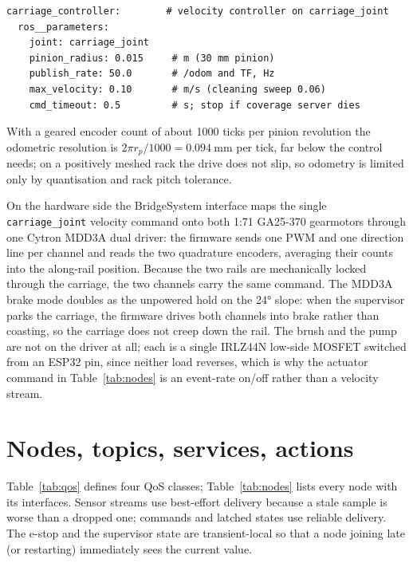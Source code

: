 \documentclass[11pt,a4paper]{article}
\newcommand{\pkg}[1]{{\ttfamily\def\_{\textunderscore\allowbreak}#1}}
\begin{document}
\begin{lstlisting}[caption={Single-axis carriage controller parameters (excerpt of
\pkg{pvbot\_base/config/controllers.yaml}). The drive is a rack-and-pinion on one
joint, so the controller commands along-rail velocity directly.}, label={lst:yaml}]
carriage_controller:        # velocity controller on carriage_joint
  ros__parameters:
    joint: carriage_joint
    pinion_radius: 0.015     # m (30 mm pinion)
    publish_rate: 50.0       # /odom and TF, Hz
    max_velocity: 0.10       # m/s (cleaning sweep 0.06)
    cmd_timeout: 0.5         # s; stop if coverage server dies
\end{lstlisting}

With a geared encoder count of about \num{1000} ticks per pinion revolution the
odometric resolution is $2\pi r_p/1000 = \SI{0.094}{\milli\metre}$ per tick, far
below the control needs; on a positively meshed rack the drive does not slip, so
odometry is limited only by quantisation and rack pitch tolerance.

On the hardware side the \pkg{BridgeSystem} interface maps the single
\texttt{carriage\_joint} velocity command onto both \num{1}:\num{71} GA25-370
gearmotors through one Cytron MDD3A dual driver: the firmware sends one PWM and
one direction line per channel and reads the two quadrature encoders, averaging
their counts into the along-rail position. Because the two rails are mechanically
locked through the carriage, the two channels carry the same command. The MDD3A
brake mode doubles as the unpowered hold on the \ang{24} slope: when the
supervisor parks the carriage, the firmware drives both channels into brake
rather than coasting, so the carriage does not creep down the rail. The brush and
the pump are not on the driver at all; each is a single IRLZ44N low-side MOSFET
switched from an ESP32 pin, since neither load reverses, which is why the
actuator command in Table~\ref{tab:nodes} is an event-rate on/off rather than a
velocity stream.

\section{Nodes, topics, services, actions}
Table~\ref{tab:qos} defines four QoS classes; Table~\ref{tab:nodes} lists every
node with its interfaces. Sensor streams use best-effort delivery because a stale
sample is worse than a dropped one; commands and latched states use reliable
delivery. The e-stop and the supervisor state are transient-local so that a node
joining late (or restarting) immediately sees the current value.
\end{document}

